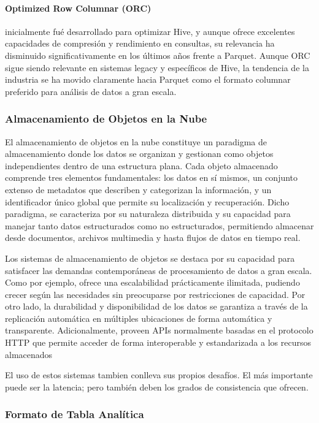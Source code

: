 \newpage
\paragraph{Optimized Row Columnar (ORC)} 
inicialmente fué desarrollado para optimizar Hive, 
y aunque ofrece excelentes capacidades de compresión y rendimiento en consultas, su relevancia 
ha disminuido significativamente en los últimos años frente a Parquet. Aunque ORC sigue siendo 
relevante en sistemas legacy y específicos de Hive, la tendencia de la industria se ha movido 
claramente hacia Parquet como el formato columnar preferido para análisis de datos a gran escala.

\subsubsection{Almacenamiento de Objetos en la Nube}

El almacenamiento de objetos en la nube constituye un paradigma de almacenamiento donde los datos se organizan y gestionan como objetos independientes dentro de una estructura plana.
Cada objeto almacenado comprende tres elementos fundamentales: los datos en sí mismos, un conjunto extenso de metadatos que describen y categorizan la información, 
y un identificador único global que permite su localización y recuperación. 
Dicho paradigma, se caracteriza por su naturaleza distribuida y su capacidad para manejar tanto datos estructurados como no estructurados, 
permitiendo almacenar desde documentos, archivos multimedia y hasta flujos de datos en tiempo real.

Los sistemas de almacenamiento de objetos se destaca por su capacidad para satisfacer las demandas contemporáneas de procesamiento de datos a gran escala.
Como por ejemplo, ofrece una escalabilidad prácticamente ilimitada, pudiendo crecer según las necesidades sin preocuparse por restricciones de capacidad.
Por otro lado, la durabilidad y disponibilidad de los datos se garantiza a través de la replicación automática en múltiples ubicaciones de forma automática y transparente.
Adicionalmente, proveen APIs normalmente basadas en el protocolo HTTP que permite acceder de forma interoperable y estandarizada a los recursos almacenados

El uso de estos sistemas tambien conlleva sus propios desafíos. El más importante puede ser la latencia; pero también deben los grados de consistencia que ofrecen.

\clearpage

\subsubsection{Formato de Tabla Analítica}

